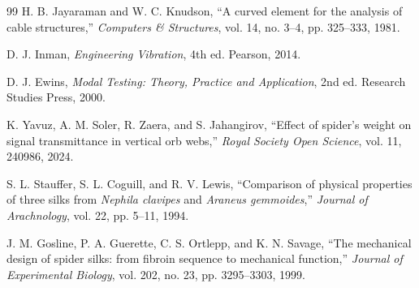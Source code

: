 \documentclass[11pt,letterpaper]{article}
\begin{document}
\begin{thebibliography}{99}
 H. B. Jayaraman and W. C. Knudson, ``A curved element for the analysis of cable structures,'' \textit{Computers \& Structures}, vol. 14, no. 3--4, pp. 325--333, 1981.

 D. J. Inman, \textit{Engineering Vibration}, 4th ed. Pearson, 2014.

 D. J. Ewins, \textit{Modal Testing: Theory, Practice and Application}, 2nd ed. Research Studies Press, 2000.

 K. Yavuz, A. M. Soler, R. Zaera, and S. Jahangirov, ``Effect of spider's weight on signal transmittance in vertical orb webs,'' \textit{Royal Society Open Science}, vol. 11, 240986, 2024.

 S. L. Stauffer, S. L. Coguill, and R. V. Lewis, ``Comparison of physical properties of three silks from \textit{Nephila clavipes} and \textit{Araneus gemmoides},'' \textit{Journal of Arachnology}, vol. 22, pp. 5--11, 1994.

 J. M. Gosline, P. A. Guerette, C. S. Ortlepp, and K. N. Savage, ``The mechanical design of spider silks: from fibroin sequence to mechanical function,'' \textit{Journal of Experimental Biology}, vol. 202, no. 23, pp. 3295--3303, 1999.

\end{thebibliography}
\end{document}
